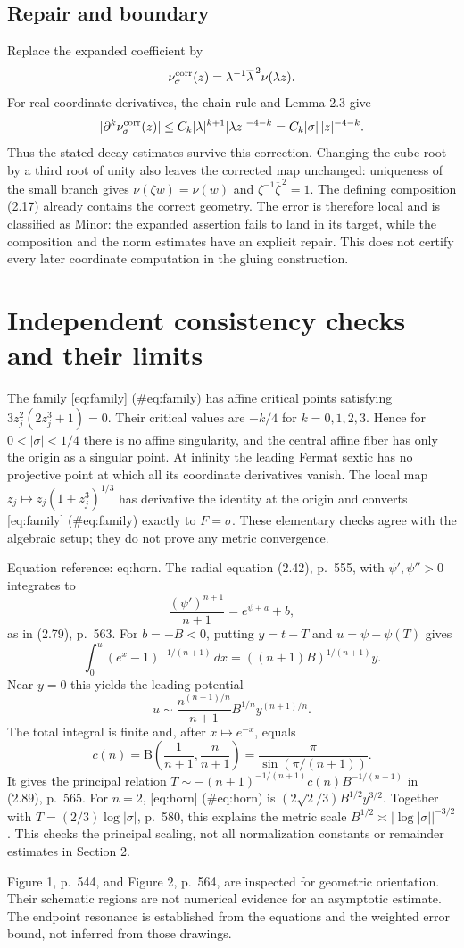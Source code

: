 \documentclass[10pt]{article}
\begin{document}
\subsection*{Repair and boundary}
Replace the expanded coefficient by \[\nu_\sigma^{\rm corr}(z)
   =\lambda^{-1}\overline\lambda^{\,2}\nu(\lambda z).\] For real-coordinate derivatives, the chain rule and Lemma 2.3 give \[|\partial^k\nu_\sigma^{\rm corr}(z)|
 \leq C_k|\lambda|^{k+1}|\lambda z|^{-4-k}
 =C_k|\sigma|\,|z|^{-4-k}.\] Thus the stated decay estimates survive this correction. Changing the cube root by a third root of unity also leaves the corrected map unchanged: uniqueness of the small branch gives \(\nu(\zeta w)=\nu(w)\) and \(\zeta^{-1}\overline\zeta^{\,2}=1\). The defining composition (2.17) already contains the correct geometry. The error is therefore local and is classified as Minor: the expanded assertion fails to land in its target, while the composition and the norm estimates have an explicit repair. This does not certify every later coordinate computation in the gluing construction.\par
\section*{Independent consistency checks and their limits}
The family [eq:family] (\#eq:family) has affine critical points satisfying \(3z_j^2(2z_j^3+1)=0\). Their critical values are \(-k/4\) for \(k=0,1,2,3\). Hence for \(0<|\sigma|<1/4\) there is no affine singularity, and the central affine fiber has only the origin as a singular point. At infinity the leading Fermat sextic has no projective point at which all its coordinate derivatives vanish. The local map \(z_j\mapsto z_j(1+z_j^3)^{1/3}\) has derivative the identity at the origin and converts [eq:family] (\#eq:family) exactly to \(F=\sigma\). These elementary checks agree with the algebraic setup; they do not prove any metric convergence.\par
Equation reference: eq:horn. The radial equation (2.42), p. 555, with \(\psi',\psi''>0\) integrates to \[\frac{(\psi')^{n+1}}{n+1}=e^{\psi+a}+b,\] as in (2.79), p. 563. For \(b=-B<0\), putting \(y=t-T\) and \(u=\psi-\psi(T)\) gives \[\int_0^u(e^x-1)^{-1/(n+1)}\,dx
       =((n+1)B)^{1/(n+1)}y.\] Near \(y=0\) this yields the leading potential \[u\sim \frac{n^{(n+1)/n}}{n+1}B^{1/n}y^{(n+1)/n}.
 \] The total integral is finite and, after \(x\mapsto e^{-x}\), equals \[c(n)=\mathrm B\!\left(\frac1{n+1},\frac n{n+1}\right)
     =\frac{\pi}{\sin(\pi/(n+1))}.\] It gives the principal relation \(T\sim-(n+1)^{-1/(n+1)}c(n)B^{-1/(n+1)}\) in (2.89), p. 565. For \(n=2\), [eq:horn] (\#eq:horn) is \((2\sqrt2/3)B^{1/2}y^{3/2}\). Together with \(T=(2/3)\log|\sigma|\), p. 580, this explains the metric scale \(B^{1/2}\asymp|\log|\sigma||^{-3/2}\). This checks the principal scaling, not all normalization constants or remainder estimates in Section 2.\par
Figure 1, p. 544, and Figure 2, p. 564, are inspected for geometric orientation. Their schematic regions are not numerical evidence for an asymptotic estimate. The endpoint resonance is established from the equations and the weighted error bound, not inferred from those drawings.\par
\end{document}
